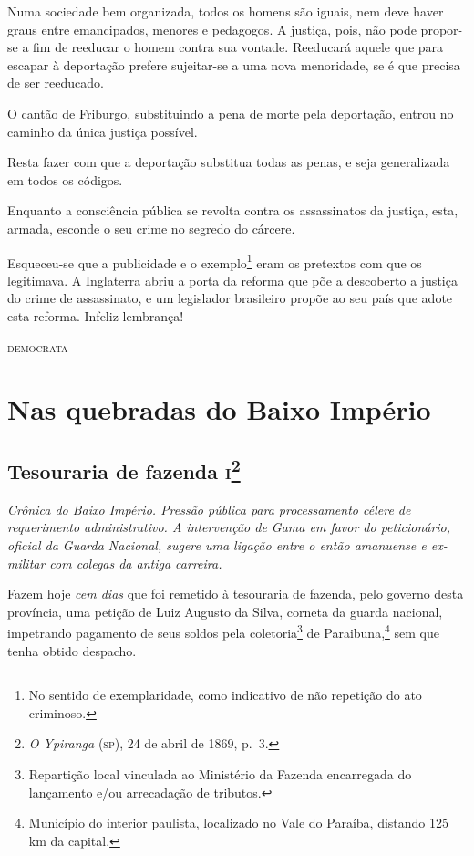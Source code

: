 Numa sociedade bem organizada, todos os homens são iguais, nem deve
haver graus entre emancipados, menores e pedagogos. A justiça, pois, não
pode propor-se a fim de reeducar o homem contra sua vontade. Reeducará
aquele que para escapar à deportação prefere sujeitar-se a uma nova
menoridade, se é que precisa de ser reeducado.

O cantão de Friburgo, substituindo a pena de morte pela deportação,
entrou no caminho da única justiça possível.

Resta fazer com que a deportação substitua todas as penas, e seja
generalizada em todos os códigos.

Enquanto a consciência pública se revolta contra os assassinatos da
justiça, esta, armada, esconde o seu crime no segredo do cárcere.

Esqueceu-se que a publicidade e o exemplo\footnote{No sentido de
  exemplaridade, como indicativo de não repetição do ato criminoso.}
eram os pretextos com que os legitimava. A Inglaterra abriu a porta da
reforma que põe a descoberto a justiça do crime de assassinato, e um
legislador brasileiro propõe ao seu país que adote esta reforma. Infeliz
lembrança!

\begin{flushright}
\textsc{democrata}
\end{flushright}

\part{Nas quebradas do Baixo Império} %

\chapter{Tesouraria de fazenda \textsc{i}\footnote{\emph{O Ypiranga} (\textsc{sp}),
  24 de abril de 1869, p.~3.}}

\begin{didascalia}\itshape
Crônica do Baixo Império. Pressão pública para processamento célere de
requerimento administrativo. A intervenção de Gama em favor do
peticionário, oficial da Guarda Nacional, sugere uma ligação entre o
então amanuense e ex-militar com colegas da antiga carreira.
\end{didascalia}


Fazem hoje \textit{cem dias} que foi remetido à tesouraria de fazenda, pelo
governo desta província, uma petição de Luiz Augusto da Silva, corneta
da guarda nacional, impetrando pagamento de seus soldos pela
coletoria\footnote{Repartição local vinculada ao Ministério da Fazenda
  encarregada do lançamento e/ou arrecadação de tributos.} de
Paraibuna,\footnote{Município do interior paulista, localizado no Vale
  do Paraíba, distando 125 km da capital.} sem que tenha obtido
despacho.

